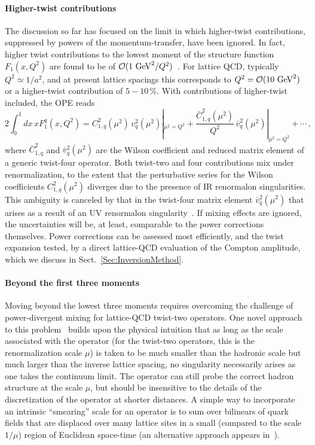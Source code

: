 \paragraph*{Higher-twist contributions}
%
The discussion so far has focused on the limit in which higher-twist contributions, suppressed by powers of the momentum-transfer, have been ignored. In fact, higher twist contributions to the lowest moment of the structure function $F_1(x,Q^2)$ are found to be of ${\cal O}(1\mbox{ GeV}^2/Q^2)$~\cite{Blumlein:2008kz}.
%
For lattice QCD, typically $Q^2 \simeq 1/a^2$, and at present lattice spacings this corresponds to $Q^2 = {\cal O}(10\mbox{ GeV}^2)$ or a higher-twist contribution of $5 - 10\, \%$. With contributions of higher-twist included, the OPE reads
\begin{equation}
2 \int_0^1 dx\, x F_1^q(x,Q^2) = C_{1,q}^2(\mu^2)\, v_q^2(\mu^2)|_{\mu^2=Q^2} + \frac{\bar{C}_{1,q}^2(\mu^2)}{Q^2}\, \bar{v}_q^2(\mu^2)|_{\mu^2=Q^2} + \cdots \,,
\label{tex}
\end{equation}
where $\bar{C}_{1,q}^2$ and $\bar{v}_q^2(\mu^2)$ are the Wilson coefficient and reduced matrix element of a generic twist-four operator. Both twist-two and four contributions mix under renormalization, to the extent that the perturbative series for the Wilson coefficients $C_{1,q}^2(\mu^2)$ diverges due to the presence of IR renormalon singularities.
%
This ambiguity is canceled by that in the twist-four matrix element $\bar{v}_q^2(\mu^2)$ that arises as a result of an UV renormalon singularity~\cite{Martinelli:1996pk}. If mixing effects are ignored, the uncertainties will be, at least, comparable to the power corrections themselves.
%
Power corrections can be assessed most efficiently, and the twist expansion tested, by a direct lattice-QCD evaluation of the Compton amplitude, which we discuss in Sect.~\ref{Sec:InversionMethod}.

\paragraph*{Beyond the first three moments}
%
Moving beyond the lowest three moments requires overcoming the challenge of power-divergent mixing for lattice-QCD twist-two operators.
%
One novel approach to this problem~\cite{Davoudi:2012ya} builds upon the physical intuition that as long as the scale associated with the operator (for the twist-two operators, this is the renormalization scale $\mu$) is taken to be much smaller than the hadronic scale but much larger than the inverse lattice spacing, no singularity necessarily arises as one takes the continuum limit.
%
The operator can still probe the correct hadron structure at the scale $\mu$, but should be insensitive to the details of the discretization of the operator at shorter distances.
%
A simple way to incorporate an intrinsic ``smearing” scale for an operator is to sum over bilinears of quark fields that are displaced over many lattice sites in a small (compared to the scale $1/\mu$) region of Euclidean space-time (an alternative approach appears in~\cite{Monahan:2015lha}).


